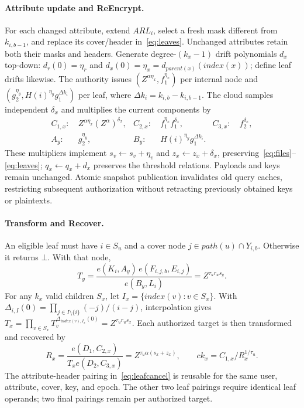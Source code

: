 \documentclass[runningheads]{llncs}
\newif\ifmarkrevisions
\newenvironment{revision}{\par\begingroup\ifmarkrevisions\color{RevisionBlue}\fi}{\par\endgroup}
\begin{document}
\begin{revision}
\paragraph{Attribute update and ReEncrypt.}
For each changed attribute, extend $ARL_i$, select a fresh mask different from
$k_{i,b-1}$, and replace its cover/header in~\eqref{eq:leaves}. Unchanged
attributes retain both their masks and headers. Generate degree-$(k_x-1)$
drift polynomials $d_x$ top-down: $d_r(0)=\eta_r$ and
$d_x(0)=\eta_x=d_{parent(x)}(index(x))$; define leaf drifts likewise.
The authority issues $(Z^{\alpha\eta_x},f_1^{\eta_x})$ per
internal node and $(g_2^{\eta_y},H(i)^{\eta_y}g_1^{\Delta k_i})$ per leaf,
where $\Delta k_i=k_{i,b}-k_{i,b-1}$. The cloud samples independent $\delta_x$
and multiplies the current components by
\begin{align}
 C_{1,x}:&\ Z^{\alpha\eta_x}(Z^\alpha)^{\delta_x},&
 C_{2,x}:&\ f_1^{\eta_x}f_1^{\delta_x},&
 C_{3,x}:&\ f_2^{\delta_x},\label{eq:update}\\
 A_y:&\ g_2^{\eta_y},& B_y:&\ H(i)^{\eta_y}g_1^{\Delta k_i}.\nonumber
\end{align}
These multipliers implement $s_v\leftarrow s_v+\eta_v$ and
$z_x\leftarrow z_x+\delta_x$, preserving~\eqref{eq:files}--\eqref{eq:leaves};
$q_x\leftarrow q_x+d_x$ preserves the threshold relations. Payloads and keys
remain unchanged. Atomic snapshot publication invalidates old query caches,
restricting subsequent authorization without retracting previously obtained
keys or plaintexts.

\paragraph{Transform and Recover.}
An eligible leaf must have $i\in S_u$ and a cover node
$j\in path(u)\cap Y_{i,b}$. Otherwise it returns $\bot$. With that node,
\begin{equation}
 T_y=\frac{e(K_i,A_y)\,e(F_{i,j,b},E_{i,j})}{e(B_y,L_i)}
     =Z^{\tau_u r_u s_y}.\label{eq:leafcancel}
\end{equation}
For any $k_x$ valid children $S_x$, let $I_x=\{index(v):v\in S_x\}$.
With $\Delta_{i,I}(0)=\prod_{j\in I\setminus\{i\}}(-j)/(i-j)$, interpolation gives
$T_x=\prod_{v\in S_x}T_v^{\Delta_{index(v),I_x}(0)}=Z^{\tau_u r_u s_x}$.
Each authorized target is then transformed and recovered by
\begin{equation}
 R_x=\frac{e(D_1,C_{2,x})}{T_xe(D_2,C_{3,x})}
     =Z^{\tau_u\alpha(s_x+z_x)},\qquad
 ck_x=C_{1,x}/R_x^{1/\tau_u}.\label{eq:recover}
\end{equation}
The attribute-header pairing in~\eqref{eq:leafcancel} is reusable for the same
user, attribute, cover, key, and epoch. The other two leaf pairings require
identical leaf operands; two final pairings remain per authorized target.
\end{revision}
\end{document}
